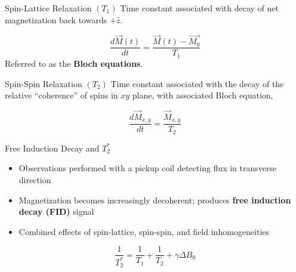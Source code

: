 \documentclass[aspectratio=169,xcolor=dvipsnames]{beamer}
\newcommand{\halfpi}{\frac{\pi}{2}}
\begin{document}
\begin{frame}{Spin-Lattice Relaxation $(T_1)$}
    Time constant associated with decay of net magnetization back towards $+\hat{z}$. 

    \begin{equation}\label{eqn:bloch-t1}
        \frac{d \vec{M}(t)}{dt} = \frac{\vec{M}(t)-\vec{M_0}}{T_1}
    \end{equation}
    Referred to as the \textbf{Bloch equations}. 
\end{frame}

\begin{frame}{Spin-Spin Relaxation $(T_2)$}
    Time constant associated with the decay of the relative ``coherence'' of spins in $xy$ plane, with associated Bloch equation,    

    \begin{equation}\label{eqn:bloch-t2}
        \frac{d\vec{M}_{x,y}}{dt} = \frac{\vec{M}_{x,y}}{T_2}
    \end{equation}
\end{frame}

\begin{frame}{Free Induction Decay and $T_2^*$}
    \begin{itemize}
        \item Observations performed with a pickup coil detecting flux in transverse direction
        \item Magnetization becomes increasingly decoherent; produces \textbf{free induction decay (FID)} signal
        \item Combined effects of spin-lattice, spin-spin, and field inhomogeneities \cite{principles-resonance}
    \end{itemize}
    \begin{equation}
        \frac{1}{T_2^*} = \frac{1}{T_1}+\frac{1}{T_2}+ \gamma \Delta B_0
    \end{equation}
    
\end{frame}
    
\end{document}

